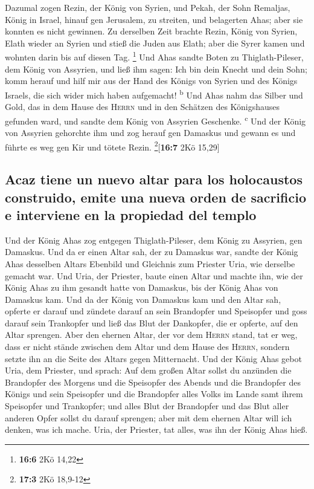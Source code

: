  Dazumal zogen Rezin, der König von Syrien, und Pekah, der
Sohn Remaljas, König in Israel, hinauf gen Jerusalem, zu streiten, und
belagerten Ahas; aber sie konnten es nicht gewinnen.  Zu
derselben Zeit brachte Rezin, König von Syrien, Elath wieder an Syrien
und stieß die Juden aus Elath; aber die Syrer kamen und wohnten darin
bis auf diesen Tag. \footnote{\textbf{16:6} 2Kö 14,22} 
Und Ahas sandte Boten zu Thiglath-Pileser, dem König von Assyrien, und
ließ ihm sagen: Ich bin dein Knecht und dein Sohn; komm herauf und hilf
mir aus der Hand des Königs von Syrien und des Königs Israels, die sich
wider mich haben aufgemacht! \textsuperscript{b}  Und Ahas
nahm das Silber und Gold, das in dem Hause des \textsc{Herrn} und in den
Schätzen des Königshauses gefunden ward, und sandte dem König von
Assyrien Geschenke. \textsuperscript{c}  Und der König von
Assyrien gehorchte ihm und zog herauf gen Damaskus und gewann es und
führte es weg gen Kir und tötete Rezin. \footnote{\textbf{17:3} 2Kö
  18,9-12}{[}\textbf{16:7} 2Kö 15,29{]}

\hypertarget{acaz-tiene-un-nuevo-altar-para-los-holocaustos-construido-emite-una-nueva-orden-de-sacrificio-e-interviene-en-la-propiedad-del-templo}{%
\subsection{Acaz tiene un nuevo altar para los holocaustos construido,
emite una nueva orden de sacrificio e interviene en la propiedad del
templo}\label{acaz-tiene-un-nuevo-altar-para-los-holocaustos-construido-emite-una-nueva-orden-de-sacrificio-e-interviene-en-la-propiedad-del-templo}}

 Und der König Ahas zog entgegen Thiglath-Pileser, dem
König zu Assyrien, gen Damaskus. Und da er einen Altar sah, der zu
Damaskus war, sandte der König Ahas desselben Altars Ebenbild und
Gleichnis zum Priester Uria, wie derselbe gemacht war. 
Und Uria, der Priester, baute einen Altar und machte ihn, wie der König
Ahas zu ihm gesandt hatte von Damaskus, bis der König Ahas von Damaskus
kam.  Und da der König von Damaskus kam und den Altar
sah, opferte er darauf  und zündete darauf an sein
Brandopfer und Speisopfer und goss darauf sein Trankopfer und ließ das
Blut der Dankopfer, die er opferte, auf den Altar sprengen.
 Aber den ehernen Altar, der vor dem \textsc{Herrn}
stand, tat er weg, dass er nicht stände zwischen dem Altar und dem Hause
des \textsc{Herrn}, sondern setzte ihn an die Seite des Altars gegen
Mitternacht.  Und der König Ahas gebot Uria, dem
Priester, und sprach: Auf dem großen Altar sollst du anzünden die
Brandopfer des Morgens und die Speisopfer des Abends und die Brandopfer
des Königs und sein Speisopfer und die Brandopfer alles Volks im Lande
samt ihrem Speisopfer und Trankopfer; und alles Blut der Brandopfer und
das Blut aller anderen Opfer sollst du darauf sprengen; aber mit dem
ehernen Altar will ich denken, was ich mache.  Uria, der
Priester, tat alles, was ihn der König Ahas hieß.

